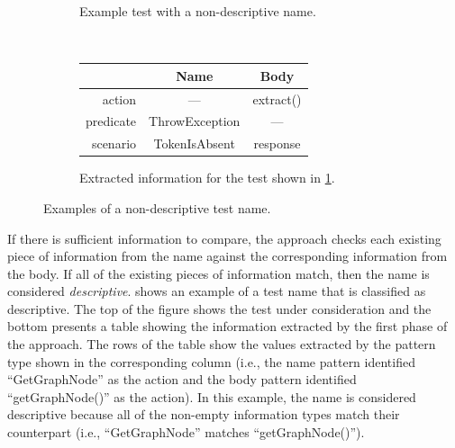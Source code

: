 \documentclass[proposal.tex]{subfiles}
\begin{document}
\begin{figure}[t]
    \centering
    \begin{subfigure}{0.8\textwidth}
    \centering
        \caption{Example test with a non-descriptive name.}
        \label{PatternExample_detectedPoorName_code}
    \end{subfigure}
    \\[0.5ex]
    \begin{subfigure}{0.9\textwidth}
    \centering
        \begin{tabular}{rcc}
        \toprule
                  & Name           & Body      \\
        \midrule
        action    & ---            & extract() \\
        predicate & ThrowException & ---       \\
        scenario  & TokenIsAbsent  & response  \\
        \bottomrule
        \end{tabular}
        \caption{Extracted information for the test shown in \cref{PatternExample_detectedPoorName_code}.}
        \label{PatternExample_detectedPoorName}
    \end{subfigure}
    \caption{Examples of a non-descriptive test name.}
    \label{fig:non-descriptive-examples}
\end{figure}


If there is sufficient information to compare, the approach checks each existing piece of information from the name against the corresponding information from the body.
%
If all of the existing pieces of information match, then the name is considered \emph{descriptive}.
%
 shows an example of a test name that is classified as descriptive.
%
The top of the figure shows the test under consideration and the bottom presents a table showing the information extracted by the first phase of the approach.
%
The rows of the table show the values extracted by the pattern type shown in the corresponding column (i.e., the name pattern identified \enquote{GetGraphNode} as the action and the body pattern identified \enquote{getGraphNode()} as the action).
%
In this example, the name is considered descriptive because all of the non-empty information types match their counterpart (i.e., \enquote{GetGraphNode} matches \enquote{getGraphNode()}).
\end{document}
